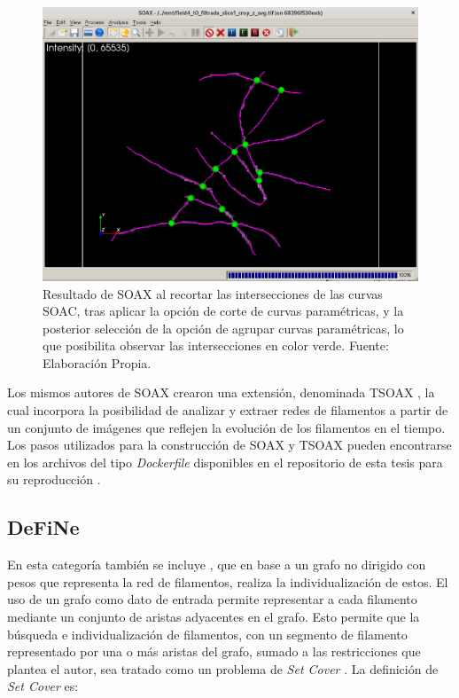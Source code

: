 \begin{figure}[h]
    \centering
    \includegraphics[scale=0.3]{evalImages/field4-nodes-soax.png}
    \caption[Identificaci\'on de intersecciones de curvas SOAC]{Resultado de SOAX al recortar las intersecciones de las curvas SOAC, tras aplicar la opci\'on de corte de curvas param\'etricas, y la posterior selecci\'on de la opci\'on de agrupar curvas param\'etricas, lo que posibilita observar las intersecciones en color verde. Fuente: Elaboraci\'on Propia.}
    \label{fig:SOAXexampleJunctions}
\end{figure}


Los mismos autores de SOAX crearon una extensi\'on, denominada TSOAX , la cual incorpora la posibilidad de analizar y extraer redes de filamentos a partir de un conjunto de im\'agenes que reflejen la evoluci\'on de los filamentos en el tiempo. Los pasos utilizados para la construcci\'on de SOAX y TSOAX  pueden encontrarse en los archivos del tipo {\it Dockerfile} disponibles en el repositorio de esta tesis para su reproducci\'on .



\subsection{DeFiNe}
En esta categor\'ia tambi\'en se incluye \citet{breuer2015define}, que en base a un grafo no dirigido con pesos que representa la red de filamentos, realiza la individualizaci\'on de estos. El uso de un grafo como dato de entrada permite representar a cada filamento mediante un conjunto de aristas adyacentes en el grafo. Esto permite que la b\'usqueda e individualizaci\'on de filamentos, con un segmento de filamento representado por una o m\'as aristas del grafo, sumado a las restricciones que plantea el autor, sea tratado como un problema de {\it Set Cover} . La definici\'on de {\it Set Cover} es:

